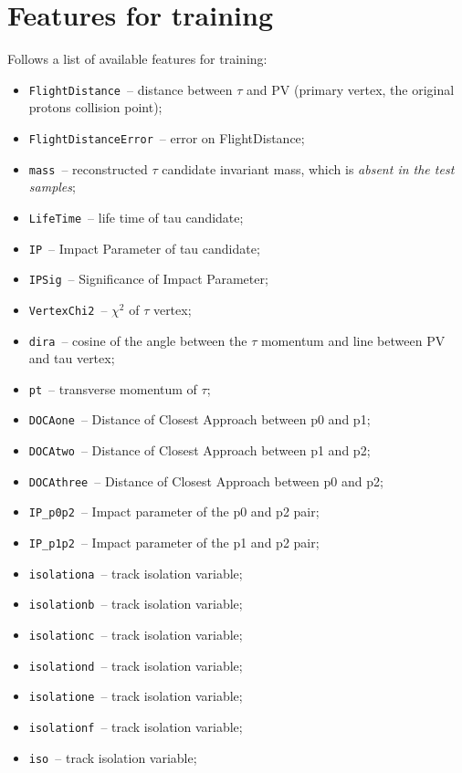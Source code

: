\documentclass[conference]{IEEEtran}
\begin{document}
\section{Features for training}
\label{sec:features}
Follows a list of available features for training:
\begin{itemize}
	\item \texttt{FlightDistance}~-- distance between $\tau$ and PV (primary vertex, the
	original protons collision point);
	\item \texttt{FlightDistanceError}~-- error on FlightDistance;
	\item \texttt{mass}~-- reconstructed $\tau$ candidate invariant mass, which
	is \textit{absent in the test samples};
	\item \texttt{LifeTime}~-- life time of tau candidate;
	\item \texttt{IP}~-- Impact Parameter of tau candidate;
	\item \texttt{IPSig}~-- Significance of Impact Parameter;
	\item \texttt{VertexChi2}~-- $\chi^2$ of $\tau$ vertex;
	\item \texttt{dira}~-- cosine of the angle between the $\tau$ momentum and line
	between PV and tau vertex;
	\item \texttt{pt}~-- transverse momentum of $\tau$;
	\item \texttt{DOCAone}~-- Distance of Closest Approach between p0 and p1;
	\item \texttt{DOCAtwo}~-- Distance of Closest Approach between p1 and p2;
	\item \texttt{DOCAthree}~-- Distance of Closest Approach between p0 and p2;
	\item \texttt{IP\_p0p2}~-- Impact parameter of the p0 and p2 pair;
	\item \texttt{IP\_p1p2}~-- Impact parameter of the p1 and p2 pair;
	\item \texttt{isolationa}~-- track isolation variable;
	\item \texttt{isolationb}~-- track isolation variable;
	\item \texttt{isolationc}~-- track isolation variable;
	\item \texttt{isolationd}~-- track isolation variable;
	\item \texttt{isolatione}~-- track isolation variable;
	\item \texttt{isolationf}~-- track isolation variable;
	\item \texttt{iso}~-- track isolation variable;

\end{itemize}
\end{document}
